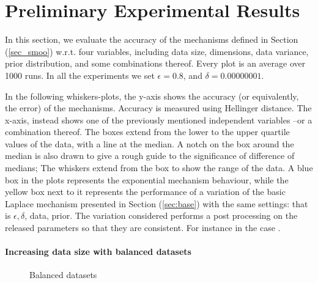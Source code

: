\documentclass[sigconf, anonymous]{acmart}
\begin{document}
\section{Preliminary Experimental Results}
\label{sec_experiment}
In this section, we evaluate the accuracy of the mechanisms defined in
Section (\ref{sec_smoo}) w.r.t. four variables, including data size, dimensions,
data variance, prior distribution, and some combinations thereof.
Every plot is an average over 1000 runs. In all the experiments we set
$\epsilon = 0.8$, and $\delta = 0.00000001$.

\noindent In the following whiskers-plots, the y-axis shows the accuracy (or equivalently, the error) of the mechanisms.
Accuracy is measured using Hellinger distance. The x-axis, instead shows  one of the previously mentioned
independent variables --or a combination thereof.
The boxes extend from the lower to the upper quartile values of the data, with a line at the median. A notch on the box around the median
is also drawn to give a rough guide to the significance of difference of medians;
The whiskers extend from the box to show the range of the data. 
A blue box in the plots represents the exponential mechanism behaviour,
while the yellow box next to it represents the performance of a variation of the
basic Laplace mechanism presented in Section (\ref{sec:base}) with the same settings: that is $\epsilon, \delta$, data, prior.
The variation considered performs a post processing on the released parameters so that they
are consistent. For instance in the case .
\paragraph{Increasing data size with balanced datasets}
\label{subsubsec_vs_datasize}

\begin{figure}[ht]
\begin{center}
\centering
\caption{Balanced datasets}
\label{fig_vs_datasize}
\end{center}
\end{figure}
\end{document}
